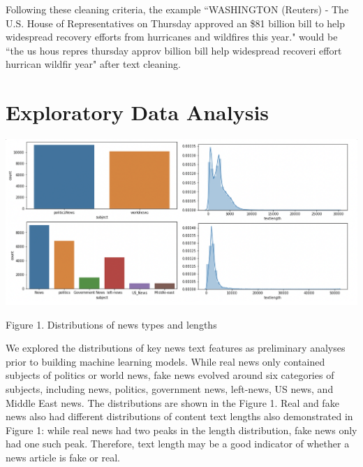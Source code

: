 \documentclass{article}
\begin{document}
\begin{multicols}{2}
Following these cleaning criteria, the example ``WASHINGTON (Reuters) - The U.S. House of Representatives on Thursday approved an \$81 billion bill to help widespread recovery efforts from hurricanes and wildfires this year." would be ``the us hous repres thursday approv billion bill help widespread recoveri effort hurrican wildfir year" after text cleaning.

\section{Exploratory Data Analysis}


\begin{center}
\includegraphics[scale=0.25]{images/img4.png}
\newline
\caption{Figure 1. Distributions of news types and lengths}
\end{center}

We explored the distributions of key news text features as preliminary analyses prior to building machine learning models. While real news only contained subjects of politics or world news, fake news evolved around six categories of subjects, including news, politics, government news, left-news, US news, and Middle East news. The distributions are shown in the Figure 1. Real and fake news also had different distributions of content text lengths also demonstrated in Figure 1: while real news had two peaks in the length distribution, fake news only had one such peak. Therefore, text length may be a good indicator of whether a news article is fake or real.  



\end{multicols}
\end{document}
